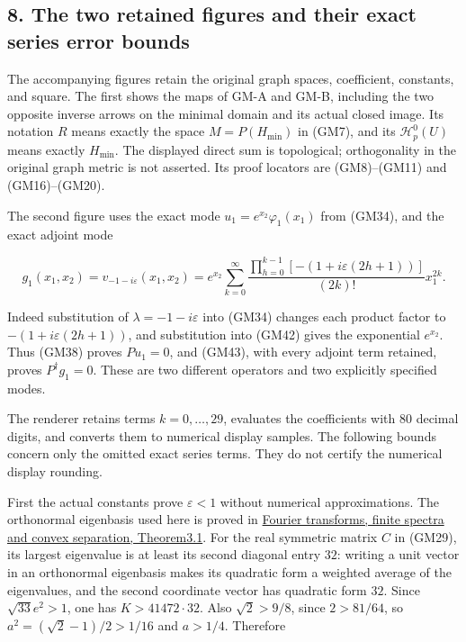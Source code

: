 \documentclass[
  11pt,
]{article}
\begin{document}
\subsection{8. The two retained figures and their exact series error
bounds}\label{the-two-retained-figures-and-their-exact-series-error-bounds}

The accompanying figures retain the original graph spaces, coefficient,
constants, and square. The first shows the maps of GM-A and GM-B,
including the two opposite inverse arrows on the minimal domain and its
actual closed image. Its notation \(R\) means
exactly the space \(M=P(H_{\min})\) in (GM7), and its
\(\mathcal H_p^0(U)\) means exactly \(H_{\min}\). The
displayed direct sum is topological; orthogonality in the original graph
metric is not asserted. Its proof locators are (GM8)--(GM11) and
(GM16)--(GM20).

The second figure uses the exact mode \(u_1=e^{x_2}\varphi_1(x_1)\) from
(GM34), and the exact adjoint mode

\[
 g_1(x_1,x_2)=v_{-1-i\varepsilon}(x_1,x_2)
   =e^{x_2}\sum_{k=0}^{\infty}
       \frac{\prod_{h=0}^{k-1}[-(1+i\varepsilon(2h+1))]}{(2k)!}x_1^{2k}.
 \tag{GM49}
\]

Indeed substitution of \(\lambda=-1-i\varepsilon\) into (GM34) changes
each product factor to \(-(1+i\varepsilon(2h+1))\), and substitution into
(GM42) gives the exponential \(e^{x_2}\). Thus (GM38)
proves \(Pu_1=0\), and (GM43), with every adjoint term
retained, proves \(P^\dagger g_1=0\). These are two different
operators and two explicitly specified modes.

The renderer retains terms \(k=0,\ldots,29\), evaluates the
coefficients with 80 decimal digits, and converts them to numerical
display samples. The following bounds concern only the omitted exact
series terms. They do not certify the numerical display rounding.

First the actual constants prove \(\varepsilon<1\) without
numerical approximations. The orthonormal eigenbasis used here is proved
in
\href{../../prerequisite-bridges.html\#real-spectral-decomposition}{Fourier
transforms, finite spectra and convex separation, Theorem3.1}. For the
real symmetric matrix \(C\) in (GM29), its largest
eigenvalue is at least its second diagonal entry
\(32\): writing a unit vector in an orthonormal
eigenbasis makes its quadratic form a weighted average of the
eigenvalues, and the second coordinate vector has quadratic form
\(32\). Since \(\sqrt{33}e^2>1\), one has
\(K>41472\cdot32\). Also \(\sqrt2>9/8\), since
\(2>81/64\), so \(a^2=(\sqrt2-1)/2>1/16\) and
\(a>1/4\). Therefore
\end{document}
